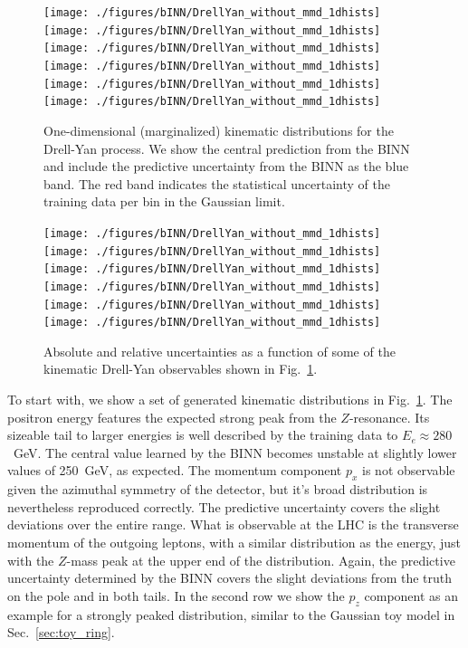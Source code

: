 \begin{figure}[t]
\texttt{[image: ./figures/bINN/DrellYan\_without\_mmd\_1dhists]}
\texttt{[image: ./figures/bINN/DrellYan\_without\_mmd\_1dhists]}
\texttt{[image: ./figures/bINN/DrellYan\_without\_mmd\_1dhists]}\\
\texttt{[image: ./figures/bINN/DrellYan\_without\_mmd\_1dhists]}
\texttt{[image: ./figures/bINN/DrellYan\_without\_mmd\_1dhists]}
\texttt{[image: ./figures/bINN/DrellYan\_without\_mmd\_1dhists]}
\caption{One-dimensional (marginalized) kinematic distributions for
  the Drell-Yan process.  We show the central prediction from the BINN
  and include the predictive uncertainty from the BINN as the blue
  band. The red band indicates the statistical uncertainty of the
  training data per bin in the Gaussian limit.}
\label{fig:DY}
\end{figure}

\begin{figure}[t]
\texttt{[image: ./figures/bINN/DrellYan\_without\_mmd\_1dhists]}
\texttt{[image: ./figures/bINN/DrellYan\_without\_mmd\_1dhists]}
\texttt{[image: ./figures/bINN/DrellYan\_without\_mmd\_1dhists]}\\
\texttt{[image: ./figures/bINN/DrellYan\_without\_mmd\_1dhists]}
\texttt{[image: ./figures/bINN/DrellYan\_without\_mmd\_1dhists]}
\texttt{[image: ./figures/bINN/DrellYan\_without\_mmd\_1dhists]}
\caption{Absolute and relative uncertainties as a function of some of
  the kinematic Drell-Yan observables shown in Fig.~\ref{fig:DY}.}
\label{fig:DY_unc}
\end{figure}

To start with, we show a set of generated kinematic distributions in
Fig.~\ref{fig:DY}. The positron energy features the expected strong
peak from the $Z$-resonance. Its sizeable tail to larger energies is
well described by the training data to $E_e \approx 280$~GeV. The
central value learned by the BINN becomes unstable at slightly lower
values of 250~GeV, as expected. The momentum component $p_x$ is not
observable given the azimuthal symmetry of the detector, but it's
broad distribution is nevertheless reproduced correctly. The
predictive uncertainty covers the slight deviations over the entire
range. What is observable at the LHC is the transverse momentum of the
outgoing leptons, with a similar distribution as the energy, just with
the $Z$-mass peak at the upper end of the distribution. Again, the
predictive uncertainty determined by the BINN covers the slight
deviations from the truth on the pole and in both tails. In the second
row we show the $p_z$ component as an example for a strongly peaked
distribution, similar to the Gaussian toy model in
Sec.~\ref{sec:toy_ring}.

